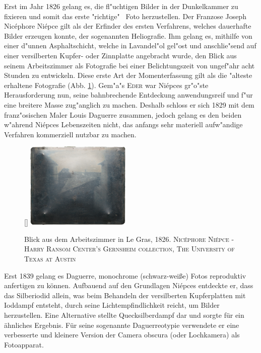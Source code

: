 \documentclass[12pt,titlepage]{article}
\begin{document}
Erst im Jahr 1826 gelang es, die fl"uchtigen Bilder in der Dunkelkammer zu fixieren und somit das erste "richtige" \ Foto herzustellen.
Der Franzose Joseph Nic\'ephore Ni\'epce gilt als der Erfinder des ersten Verfahrens, welches dauerhafte Bilder erzeugen konnte, der sogenannten Heliografie. Ihm gelang es, mithilfe von einer d"unnen Asphaltschicht, welche in Lavandel"ol gel"ost und anschlie"send auf einer versilberten Kupfer- oder Zinnplatte angebracht wurde, den Blick aus seinem Arbeitszimmer als Fotografie bei einer Belichtungszeit von ungef"ahr acht Stunden zu entwickeln. Diese erste Art der Momenterfassung gilt als die "alteste erhaltene Fotografie (Abb. \ref{fig:niepce}). Gem"a"s \textsc{Eder \cite{eder1884ausfuhrliches}} war Ni\'epces gr"o"ste Herausforderung nun, seine bahnbrechende Entdeckung anwendungsreif und f"ur eine breitere Masse zug"anglich zu machen. Deshalb schloss er sich 1829 mit dem franz"osischen Maler Louis Daguerre zusammen, jedoch gelang es den beiden w"ahrend Ni\'epces Lebenszeiten nicht, das anfangs sehr materiell aufw"andige Verfahren kommerziell nutzbar zu machen. \textsc{\cite{eder1884ausfuhrliches}}
\begin{figure}[b]

[\FBwidth]
{\includegraphics[width=5cm]{niepce_heliograph.jpg}}
{\caption{Blick aus dem Arbeitszimmer in Le Gras, 1826. \textsc {Nicéphore Niépce - Harry Ransom Center's Gernsheim collection, The University of Texas at Austin}}\label{fig:niepce}}

\end{figure}

Erst 1839 gelang es Daguerre, monochrome (schwarz-weiße) Fotos reproduktiv anfertigen zu können. Aufbauend auf den Grundlagen Niépces entdeckte er, dass das Silberiodid allein, was beim Behandeln der versilberten Kupferplatten mit Ioddampf entsteht, durch seine Lichtempfindlichkeit reicht, um Bilder herzustellen. Eine Alternative stellte Quecksilberdampf dar und sorgte für ein ähnliches Ergebnis. Für seine sogenannte Daguerreotypie verwendete er eine verbesserte und kleinere Version der Camera obscura (oder Lochkamera) als Fotoapparat. \textsc{\cite{barger2000daguerreotype}}
\end{document}
